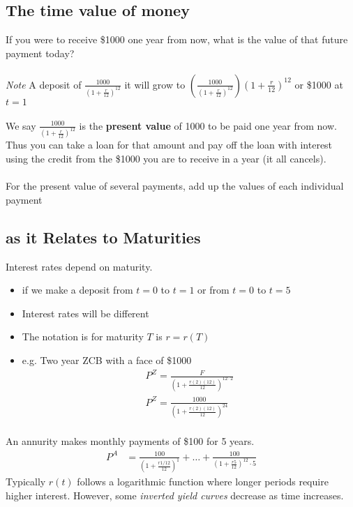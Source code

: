 \documentclass[12pt,letterpaper, twocolumn]{article}
\begin{document}
\subsection{The time value of money}
If you were to receive \$1000 one year from now, what is the value of that future payment today? 
\\\\
\textit{Note} A deposit of $\frac{1000}{(1+\frac{r}{12})^{12}}$ it will grow to $(\frac{1000}{(1+\frac{r}{12})^{12}})(1+\frac{r}{12})^{12}$ or \$1000 at $t=1$
\\\\
We say $\frac{1000}{(1+\frac{r}{12})^{12}}$ is the \textbf{present value} of 1000 to be paid one year from now. Thus you can take a loan for that amount and pay off the loan with interest using the credit from the \$1000 you are to receive in a year (it all cancels). 
\\\\
For the present value of several payments,  add up the values of each individual payment

\subsection{as it Relates to Maturities}
Interest rates depend on maturity. 
\begin{itemize}
    \item if we make a deposit from $t=0$ to $t=1$ or from $t=0$ to $t=5$
    \item Interest rates will be different
    \item The notation is for maturity $T$ is $r=r(T)$
    \item e.g. Two year ZCB with a face of \$1000
    \begin{align*}
        P^{Z} = \frac{F}{(1+\frac{r(2)(12)}{12})^{12\cdot2}}\\
        P^{Z} = \frac{1000}{(1+\frac{r(2)(12)}{12})^{24}}\\
    \end{align*}
\end{itemize}
An annurity makes monthly payments of \$100 for 5 years. 
\begin{align*}
    P^A&=\frac{100}{(1+\frac{r{1/12}}{12})^1} + \dots + \frac{100}{(1+\frac{r{5}}{12})^12\cdot5}
\end{align*}
Typically $r(t)$ follows a logarithmic function where longer periods require higher interest. However, some \textit{inverted yield curves} decrease as time increases. 
\end{document}
